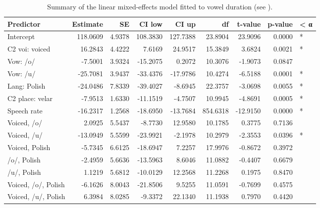 \documentclass[12pt,]{article}
\begin{document}
\begin{table}

\caption{\label{tab:vow-table}Summary of the linear mixed-effects model fitted to vowel duration (see ).}
\centering
\begin{tabular}[t]{lrrrrrrrl}
\toprule
Predictor & Estimate & SE & CI low & CI up & df & t-value & p-value & < α\\
\midrule
Intercept & 118.0609 & 4.9378 & 108.3830 & 127.7388 & 23.8904 & 23.9096 & 0.0000 & *\\
C2 voi: voiced & 16.2843 & 4.4222 & 7.6169 & 24.9517 & 15.3849 & 3.6824 & 0.0021 & *\\
Vow: /o/ & -7.5001 & 3.9324 & -15.2075 & 0.2072 & 10.3076 & -1.9073 & 0.0847 & \\
Vow: /u/ & -25.7081 & 3.9437 & -33.4376 & -17.9786 & 10.4274 & -6.5188 & 0.0001 & *\\
Lang: Polish & -24.0486 & 7.8339 & -39.4027 & -8.6945 & 22.3757 & -3.0698 & 0.0055 & *\\
\addlinespace
C2 place: velar & -7.9513 & 1.6330 & -11.1519 & -4.7507 & 10.9945 & -4.8691 & 0.0005 & *\\
Speech rate & -16.2317 & 1.2568 & -18.6950 & -13.7684 & 854.6318 & -12.9150 & 0.0000 & *\\
Voiced, /o/ & 2.0925 & 5.5437 & -8.7730 & 12.9580 & 10.1785 & 0.3775 & 0.7136 & \\
Voiced, /u/ & -13.0949 & 5.5599 & -23.9921 & -2.1978 & 10.2979 & -2.3553 & 0.0396 & *\\
Voiced, Polish & -5.7345 & 6.6125 & -18.6947 & 7.2257 & 17.9976 & -0.8672 & 0.3972 & \\
\addlinespace
/o/, Polish & -2.4959 & 5.6636 & -13.5963 & 8.6046 & 11.0882 & -0.4407 & 0.6679 & \\
/u/, Polish & 1.1219 & 5.6812 & -10.0129 & 12.2568 & 11.2268 & 0.1975 & 0.8470 & \\
Voiced, /o/, Polish & -6.1626 & 8.0043 & -21.8506 & 9.5255 & 11.0591 & -0.7699 & 0.4575 & \\
Voiced, /u/, Polish & 6.3984 & 8.0285 & -9.3372 & 22.1340 & 11.1938 & 0.7970 & 0.4420 & \\
\bottomrule
\end{tabular}
\end{table}
\end{document}
